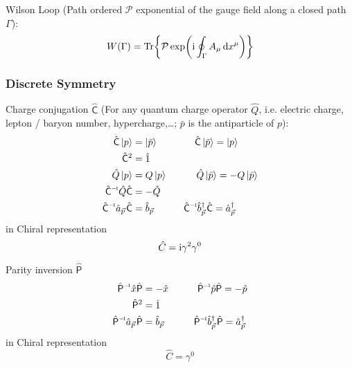 			\noindent
			Wilson Loop (Path ordered $\mathcal{P}$ exponential of the gauge field along a closed path $\Gamma$):
			\begin{equation}
				W(\Gamma) =\Tr{\mathcal{P}\exp(\mathrm{i}\oint_\Gamma A_\mu \dd{x^\mu})}
			\end{equation}

		\subsubsection{Discrete Symmetry}
			Charge conjugation $\hat{\mathsf{C}}$ (For any quantum charge operator $\hat{Q}$, i.e. electric charge, lepton / baryon number, hypercharge,\dots; $\bar{p}$ is the antiparticle of $p$):
			\begin{equation}
				\begin{aligned}
					\hat{\mathsf{C}} \Ket{p} &= \Ket{\bar{p}}
					\phantom{Q}\hsp \hat{\mathsf{C}} \Ket{\bar{p}} = \Ket{p} \\
					\hat{\mathsf{C}}^2 &= \hat{1} \\
					\hat{Q} \Ket{p} &= Q \Ket{p}
					\hsp \hat{Q} \Ket{\bar{p}} = -Q\Ket{\bar{p}} \\
					\inv{\hat{\mathsf{C}}} \hat{Q} \hat{\mathsf{C}} &= -\hat{Q} \\
					\inv{\hat{\mathsf{C}}}\hat{a}_{\vec{p}} \hat{\mathsf{C}} &= \hat{b}_{\vec{p}}
					\hsp \inv{\hat{\mathsf{C}}}\hat{b}^\dagger_{\vec{p}} \hat{\mathsf{C}} = \hat{a}^\dagger_{\vec{p}} \\
				\end{aligned}
			\end{equation}
			in Chiral representation
			\begin{equation}
				\hat{C} = \mathrm{i} \gamma^2 \gamma^0
			\end{equation}

			\noindent
			Parity inversion $\hat{\mathsf{P}}$
			\begin{equation}
				\begin{aligned}
					\inv{\hat{\mathsf{P}}} \hat{x} \hat{\mathsf{P}} &= - \hat{x}
					\hsp \inv{\hat{\mathsf{P}}} \hat{p} \hat{\mathsf{P}} = - \hat{p} \\
					\hat{\mathsf{P}}^2 &= \hat{1} \\
					\inv{\hat{\mathsf{P}}}\hat{a}_{\vec{p}} \hat{\mathsf{P}} &= \hat{b}_{\vec{p}}
					\hsp \inv{\hat{\mathsf{P}}}\hat{b}^\dagger_{\vec{p}} \hat{\mathsf{P}} = \hat{a} ^\dagger_{\vec{p}} \\
				\end{aligned}
			\end{equation}
			in Chiral representation
			\begin{equation}
				\hat{C} = \gamma^0
			\end{equation}

